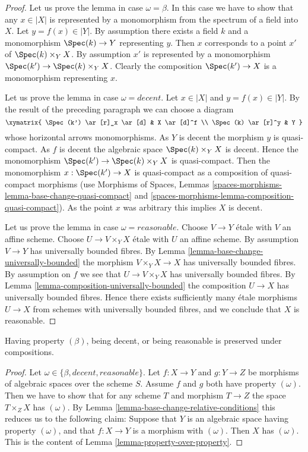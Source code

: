 \begin{proof}
Let us prove the lemma in case $\omega = \beta$. In this case we have to show
that any $x \in |X|$ is represented by a monomorphism from the spectrum
of a field into $X$. Let $y = f(x) \in |Y|$. By assumption there exists
a field $k$ and a monomorphism $\Spec(k) \to Y$ representing $y$.
Then $x$ corresponds to a point $x'$ of $\Spec(k) \times_Y X$.
By assumption $x'$ is represented by a monomorphism
$\Spec(k') \to \Spec(k) \times_Y X$. Clearly the composition
$\Spec(k') \to X$ is a monomorphism representing $x$.

\medskip\noindent
Let us prove the lemma in case $\omega = decent$.
Let $x \in |X|$ and $y = f(x) \in |Y|$. By the result of the preceding
paragraph we can choose a diagram
$$
\xymatrix{
\Spec(k') \ar[r]_x \ar[d] & X \ar[d]^f \\
\Spec(k) \ar[r]^y & Y
}
$$
whose horizontal arrows monomorphisms. As $Y$ is decent the morphism
$y$ is quasi-compact. As $f$ is decent the algebraic space
$\Spec(k) \times_Y X$ is decent. Hence the monomorphism
$\Spec(k') \to \Spec(k) \times_Y X$ is quasi-compact.
Then the monomorphism $x : \Spec(k') \to X$ is quasi-compact
as a composition of quasi-compact morphisms (use
Morphisms of Spaces, Lemmas
\ref{spaces-morphisms-lemma-base-change-quasi-compact} and
\ref{spaces-morphisms-lemma-composition-quasi-compact}).
As the point $x$ was arbitrary this implies $X$ is decent.

\medskip\noindent
Let us prove the lemma in case $\omega = reasonable$.
Choose $V \to Y$ \'etale with $V$ an affine scheme.
Choose $U \to V \times_Y X$ \'etale with $U$ an affine scheme.
By assumption $V \to Y$ has universally bounded fibres. By
Lemma \ref{lemma-base-change-universally-bounded}
the morphism $V \times_Y X \to X$ has universally bounded fibres.
By assumption on $f$ we see that $U \to V \times_Y X$ has
universally bounded fibres. By
Lemma \ref{lemma-composition-universally-bounded}
the composition $U \to X$ has universally bounded fibres.
Hence there exists sufficiently many \'etale morphisms $U \to X$
from schemes with universally bounded fibres, and we conclude
that $X$ is reasonable.
\end{proof}

\begin{lemma}
\label{lemma-composition-relative-conditions}
Having property $(\beta)$, being decent, or being reasonable
is preserved under compositions.
\end{lemma}

\begin{proof}
Let $\omega \in \{\beta, decent, reasonable\}$.
Let $f : X \to Y$ and $g : Y \to Z$ be morphisms of algebraic spaces
over the scheme $S$. Assume $f$ and $g$ both have property
$(\omega)$. Then we have to show
that for any scheme $T$ and morphism $T \to Z$ the space $T \times_Z X$
has $(\omega)$. By
Lemma \ref{lemma-base-change-relative-conditions}
this reduces us to the following claim: Suppose that $Y$ is an algebraic
space having property $(\omega)$, and that $f : X \to Y$ is a morphism
with $(\omega)$. Then $X$ has $(\omega)$.
This is the content of Lemma \ref{lemma-property-over-property}.
\end{proof}


